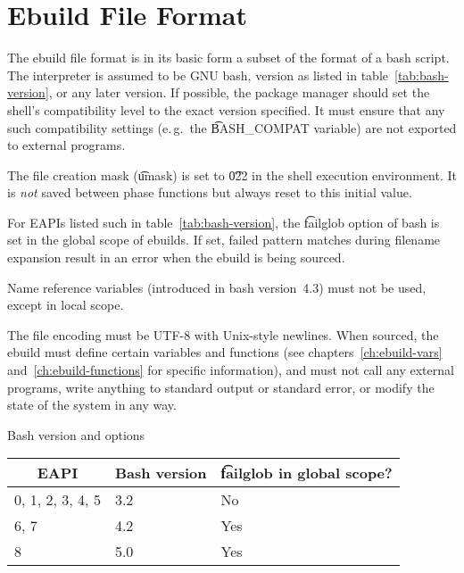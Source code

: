 \chapter{Ebuild File Format}
\label{ch:ebuild-format}

 The ebuild file format is in its basic form a subset of the format of
a bash script. The interpreter is assumed to be GNU bash, version as listed in
table~\ref{tab:bash-version}, or any later version. If possible, the package manager should set
the shell's compatibility level to the exact version specified. It must ensure that any such
compatibility settings (e.\,g.\ the \t{BASH_COMPAT} variable) are not exported to external programs.

The file creation mask (\t{umask}) is set to \t{022} in the shell execution environment. It is
\emph{not} saved between phase functions but always reset to this initial value.

 For EAPIs listed such in table~\ref{tab:bash-version}, the \t{failglob}
option of bash is set in the global scope of ebuilds. If set, failed pattern matches during
filename expansion result in an error when the ebuild is being sourced.

Name reference variables (introduced in bash version~4.3) must not be used, except in local scope.

The file encoding must be UTF-8 with Unix-style newlines. When sourced, the ebuild must define
certain variables and functions (see chapters~\ref{ch:ebuild-vars} and~\ref{ch:ebuild-functions}
for specific information), and must not call any external programs, write anything to standard
output or standard error, or modify the state of the system in any way.

\begin{centertable}{Bash version and options}
    \label{tab:bash-version}
    \begin{tabular}{lll}
      \toprule
      \multicolumn{1}{c}{\textbf{EAPI}} &
      \multicolumn{1}{c}{\textbf{Bash version}} &
      \multicolumn{1}{c}{\textbf{\t{failglob} in global scope?}} \\
      \midrule
      0, 1, 2, 3, 4, 5  & 3.2 & No  \\
      6, 7              & 4.2 & Yes \\
      8                 & 5.0 & Yes \\
      \bottomrule
    \end{tabular}
\end{centertable}


